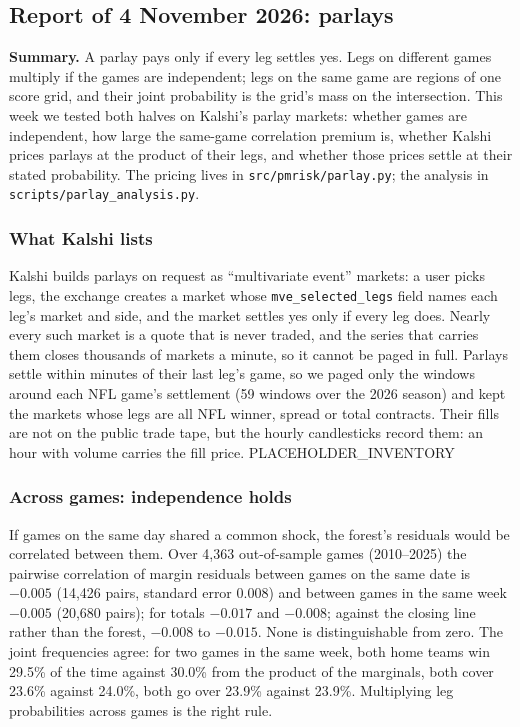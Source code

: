 \subsection{Report of 4 November 2026: parlays}\label{sec:w1104}

\textbf{Summary.} A parlay pays only if every leg settles yes. Legs on different games multiply if the games are independent; legs on the same game are regions of one score grid, and their joint probability is the grid's mass on the intersection. This week we tested both halves on Kalshi's parlay markets: whether games are independent, how large the same-game correlation premium is, whether Kalshi prices parlays at the product of their legs, and whether those prices settle at their stated probability. The pricing lives in \texttt{src/pmrisk/parlay.py}; the analysis in \texttt{scripts/parlay\_analysis.py}.

\subsubsection{What Kalshi lists}

Kalshi builds parlays on request as ``multivariate event'' markets: a user picks legs, the exchange creates a market whose \texttt{mve\_selected\_legs} field names each leg's market and side, and the market settles yes only if every leg does. Nearly every such market is a quote that is never traded, and the series that carries them closes thousands of markets a minute, so it cannot be paged in full. Parlays settle within minutes of their last leg's game, so we paged only the windows around each NFL game's settlement (59 windows over the 2026 season) and kept the markets whose legs are all NFL winner, spread or total contracts. Their fills are not on the public trade tape, but the hourly candlesticks record them: an hour with volume carries the fill price. PLACEHOLDER\_INVENTORY

\subsubsection{Across games: independence holds}

If games on the same day shared a common shock, the forest's residuals would be correlated between them. Over 4,363 out-of-sample games (2010--2025) the pairwise correlation of margin residuals between games on the same date is $-0.005$ (14,426 pairs, standard error 0.008) and between games in the same week $-0.005$ (20,680 pairs); for totals $-0.017$ and $-0.008$; against the closing line rather than the forest, $-0.008$ to $-0.015$. None is distinguishable from zero. The joint frequencies agree: for two games in the same week, both home teams win 29.5\% of the time against 30.0\% from the product of the marginals, both cover 23.6\% against 24.0\%, both go over 23.9\% against 23.9\%. Multiplying leg probabilities across games is the right rule.

